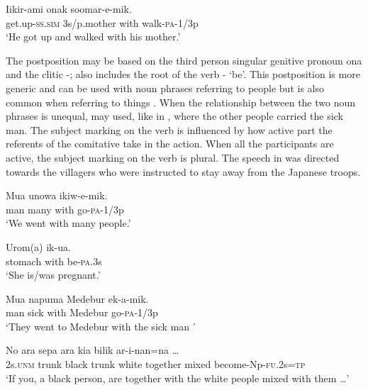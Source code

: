 \ea%
\label{ex:3:x1817}
\gll Iikir-ami onak  soomar-e-mik. \\
get.up-\textsc{ss}.\textsc{sim} 3s/p.mother with walk-\textsc{pa}-1/3p\\
\glt`He got up and walked with his mother.'
\z

The postposition  may be based on the third person singular genitive pronoun ona and the clitic -;  also includes the root of the verb \nobreakdash- `be'. This postposition is more generic and can be used with noun phrases referring to people  but is also common when referring to things . When the relationship between the two noun phrases is unequal,  may used, like in , where the other people carried the sick man. The subject marking on the verb is influenced by how active part the referents of the comitative  take in the action. When all the participants are active, the subject marking on the verb is plural. The speech in  was directed towards the villagers who were instructed to stay away from the Japanese troops. 

\ea%
\label{ex:3:x754}
\gll Mua unowa  ikiw-e-mik. \\
man many with go-\textsc{pa}-1/3p\\
\glt`We went with many people.'
\z

\ea%
\label{ex:3:x755}
\gll Urom(a)  ik-ua. \\
stomach with be-\textsc{pa}.3s\\
\glt`She is/was pregnant.'
\z

\ea%
\label{ex:3:x823}
\gll Mua napuma  Medebur ek-a-mik. \\
man sick with Medebur go-\textsc{pa}-1/3p\\
\glt`They went to Medebur with the sick man '
\z

\ea%
\label{ex:3:x1819}
\gll No ara sepa ara kia  bilik ar-i-nan=na {\dots}\\
2s.\textsc{unm} trunk black trunk white together mixed become-Np-\textsc{fu}.2s=\textsc{tp}\\
\glt`If you, a black person, are together with the white people mixed with them {\dots}'
\z

